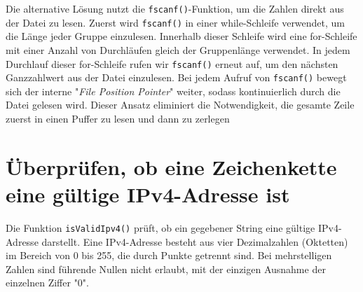 Die alternative Lösung nutzt die \texttt{fscanf()}-Funktion, um die
Zahlen direkt aus der Datei zu lesen. Zuerst wird \texttt{fscanf()} in
einer while-Schleife verwendet, um die Länge jeder Gruppe einzulesen. Innerhalb
dieser Schleife wird eine for-Schleife mit einer Anzahl von Durchläufen gleich
der Gruppenlänge verwendet. In jedem Durchlauf dieser for-Schleife rufen wir
\texttt{fscanf()} erneut auf, um den nächsten Ganzzahlwert aus der Datei
einzulesen. Bei jedem Aufruf von \texttt{fscanf()} bewegt sich der
interne "\textit{File Position Pointer}" weiter, sodass kontinuierlich durch die
Datei gelesen wird. Dieser Ansatz eliminiert die Notwendigkeit, die gesamte
Zeile zuerst in einen Puffer zu lesen und dann zu zerlegen





\chapter{Überprüfen, ob eine Zeichenkette eine gültige IPv4-Adresse ist}

Die Funktion \texttt{isValidIpv4()} prüft, ob ein gegebener String eine
gültige IPv4-Adresse darstellt. Eine IPv4-Adresse besteht aus vier Dezimalzahlen
(Oktetten) im Bereich von 0 bis 255, die durch Punkte getrennt sind. Bei
mehrstelligen Zahlen sind führende Nullen nicht erlaubt, mit der einzigen
Ausnahme der einzelnen Ziffer "0".

